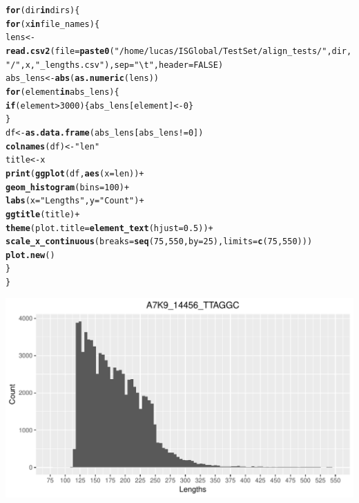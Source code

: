 \documentclass[12pt, a4paper]{article}\usepackage[]{graphicx}\usepackage[]{color}
\makeatletter
\def\maxwidth{ %
  \ifdim\Gin@nat@width>\linewidth
    \linewidth
  \else
    \Gin@nat@width
  \fi
}
\newcommand{\hlnum}[1]{\textcolor[rgb]{0.686,0.059,0.569}{#1}}%
\newcommand{\hlstr}[1]{\textcolor[rgb]{0.192,0.494,0.8}{#1}}%
\newcommand{\hlopt}[1]{\textcolor[rgb]{0,0,0}{#1}}%
\newcommand{\hlstd}[1]{\textcolor[rgb]{0.345,0.345,0.345}{#1}}%
\newcommand{\hlkwa}[1]{\textcolor[rgb]{0.161,0.373,0.58}{\textbf{#1}}}%
\newcommand{\hlkwb}[1]{\textcolor[rgb]{0.69,0.353,0.396}{#1}}%
\newcommand{\hlkwc}[1]{\textcolor[rgb]{0.333,0.667,0.333}{#1}}%
\newcommand{\hlkwd}[1]{\textcolor[rgb]{0.737,0.353,0.396}{\textbf{#1}}}%
\newenvironment{kframe}{%
 \def\at@end@of@kframe{}%
 \ifinner\ifhmode%
  \def\at@end@of@kframe{\end{minipage}}%
  \begin{minipage}{\columnwidth}%
 \fi\fi%
 \def\FrameCommand##1{\hskip\@totalleftmargin \hskip-\fboxsep
 \colorbox{shadecolor}{##1}\hskip-\fboxsep
     \hskip-\linewidth \hskip-\@totalleftmargin \hskip\columnwidth}%
 \MakeFramed {\advance\hsize-\width
   \@totalleftmargin\z@ \linewidth\hsize
   \@setminipage}}%
 {\par\unskip\endMakeFramed%
 \at@end@of@kframe}
\newenvironment{knitrout}{}{} %
\makeatother
\begin{document}
\begin{knitrout}
\color{fgcolor}\begin{kframe}
\begin{alltt}
\hlkwa{for} \hlstd{(dir} \hlkwa{in} \hlstd{dirs)\{}
  \hlkwa{for} \hlstd{(x} \hlkwa{in} \hlstd{file_names)\{}
    \hlstd{lens} \hlkwb{<-} \hlkwd{read.csv2}\hlstd{(}\hlkwc{file} \hlstd{=} \hlkwd{paste0}\hlstd{(}\hlstr{"/home/lucas/ISGlobal/TestSet/align_tests/"}\hlstd{,dir,}\hlstr{"/"}\hlstd{,x,}\hlstr{"_lengths.csv"}\hlstd{),} \hlkwc{sep} \hlstd{=} \hlstr{"\textbackslash{}t"}\hlstd{,} \hlkwc{header} \hlstd{=} \hlnum{FALSE}\hlstd{)}
    \hlstd{abs_lens} \hlkwb{<-} \hlkwd{abs}\hlstd{(}\hlkwd{as.numeric}\hlstd{(lens))}
    \hlkwa{for} \hlstd{(element} \hlkwa{in} \hlstd{abs_lens)\{}
      \hlkwa{if} \hlstd{(element} \hlopt{>} \hlnum{3000}\hlstd{)\{abs_lens[element]} \hlkwb{<-} \hlnum{0}\hlstd{\}}
    \hlstd{\}}
    \hlstd{df} \hlkwb{<-} \hlkwd{as.data.frame}\hlstd{(abs_lens[abs_lens} \hlopt{!=} \hlnum{0}\hlstd{])}
    \hlkwd{colnames}\hlstd{(df)} \hlkwb{<-} \hlstr{"len"}
    \hlstd{title} \hlkwb{<-} \hlstd{x}
    \hlkwd{print}\hlstd{(}\hlkwd{ggplot}\hlstd{(df,} \hlkwd{aes}\hlstd{(}\hlkwc{x} \hlstd{= len))} \hlopt{+}
        \hlkwd{geom_histogram}\hlstd{(}\hlkwc{bins} \hlstd{=} \hlnum{100}\hlstd{)} \hlopt{+}
        \hlkwd{labs}\hlstd{(}\hlkwc{x} \hlstd{=} \hlstr{"Lengths"}\hlstd{,} \hlkwc{y} \hlstd{=} \hlstr{"Count"}\hlstd{)} \hlopt{+}
        \hlkwd{ggtitle}\hlstd{(title)} \hlopt{+}
        \hlkwd{theme}\hlstd{(}\hlkwc{plot.title} \hlstd{=} \hlkwd{element_text}\hlstd{(}\hlkwc{hjust} \hlstd{=} \hlnum{0.5}\hlstd{))} \hlopt{+}
        \hlkwd{scale_x_continuous}\hlstd{(}\hlkwc{breaks} \hlstd{=} \hlkwd{seq}\hlstd{(}\hlnum{75}\hlstd{,} \hlnum{550}\hlstd{,} \hlkwc{by} \hlstd{=} \hlnum{25}\hlstd{),} \hlkwc{limits} \hlstd{=} \hlkwd{c}\hlstd{(}\hlnum{75}\hlstd{,}\hlnum{550}\hlstd{)))}
    \hlkwd{plot.new}\hlstd{()}
  \hlstd{\}}
\hlstd{\}}
\end{alltt}


{\ttfamily\noindent\color{warningcolor}{\#\# Warning: Removed 947157 rows containing non-finite values (stat\_bin).}}

{\ttfamily\noindent\color{warningcolor}{\#\# Warning: Removed 1 rows containing missing values (geom\_bar).}}\end{kframe}
\includegraphics[width=\maxwidth]{figure/unnamed-chunk-4-1} 


\end{knitrout}
\end{document}
